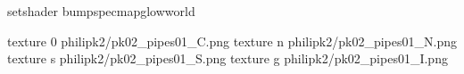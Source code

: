 setshader bumpspecmapglowworld


texture 0 philipk2/pk02_pipes01_C.png
texture n philipk2/pk02_pipes01_N.png
texture s philipk2/pk02_pipes01_S.png
texture g philipk2/pk02_pipes01_I.png

